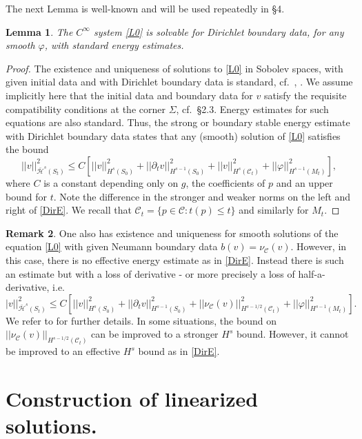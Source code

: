 \documentclass[10pt]{amsart}
\newcommand{\f}{\varphi}
\newcommand{\Si}{\Sigma}
\newcommand{\cC}{{\mathcal C}}
\newcommand{\cH}{{\mathcal H}}
\newcommand{\be}{\begin{equation}}
\newcommand{\ee}{\end{equation}}
\newcommand{\p}{\partial}
\newcommand{\<}{\langle}
\renewcommand{\>}{\rangle}
\theoremstyle{plain}
\newtheorem{lemma}{Lemma}[section]
\theoremstyle{remark}
\theoremstyle{definition}
\newtheorem{remark}[lemma]{Remark}
\numberwithin{equation}{section}
\begin{document}
 The next Lemma is well-known and will be used repeatedly in \S 4. 

\begin{lemma} \label{DirSomm}
The $C^{\infty}$ system \eqref{L0} is solvable for Dirichlet boundary data, for any smooth $\f$, with standard energy estimates. 
\end{lemma}

\begin{proof} 

  The existence and uniqueness of solutions to \eqref{L0} in Sobolev spaces, with given initial data and with Dirichlet boundary data is standard, 
cf.~\cite{BS}, \cite{Sa}. We assume implicitly here that the initial data and boundary data for $v$ satisfy the requisite compatibility conditions at the 
corner $\Si$, cf.~\S 2.3. Energy estimates for such equations are also standard. Thus, the strong or boundary stable energy estimate with Dirichlet 
boundary data states that any (smooth) solution of \eqref{L0} satisfies the bound 
\be \label{DirE}
||v||_{\bar \cH^s(S_t)}^2 \leq C[||v||_{H^s(S_0)}^2 + ||\p_t v||_{H^{s-1}(S_0)}^2 + ||v||_{H^s(\cC_t)}^2 + ||\f||_{H^{s-1}(M_t)}^2],
\ee
where $C$ is a constant depending only on $g$, the coefficients of $p$ and an upper bound for $t$. Note the difference in the stronger and weaker 
norms on the left and right of \eqref{DirE}. We recall that $\cC_t = \{p \in \cC: t(p) \leq t\}$ and similarly for $M_t$. 

 \end{proof}

\begin{remark} \label{Neumann} 
{\rm One also has existence and uniqueness for smooth solutions of the equation \eqref{L0} with given Neumann boundary data $b(v) = \nu_{\cC}(v)$. 
However, in this case, there is no effective energy estimate as in \eqref{DirE}. Instead there is such an estimate but with a loss 
of derivative - or more precisely a loss of half-a-derivative, i.e.
\be \label{NeuE}
|v||_{\bar \cH^s(S_t)}^2 \leq C[||v||_{H^s(S_0)}^2 + ||\p_t v||_{H^{s-1}(S_0)}^2 + ||\nu_{\cC}(v)||_{H^{s-1/2}(\cC_t)}^2 + ||\f||_{H^{s-1}(M_t)}^2].
\ee
We refer to \cite{T} for further details. In some situations, the bound on $||\nu_{\cC}(v)||_{H^{s-1/2}(\cC_t)}$ can be improved to a stronger 
$H^s$ bound. However, it cannot be improved to an effective $H^s$ bound as in \eqref{DirE}. 
}
\end{remark}


 \section{Construction of linearized solutions.} 
\end{document}
